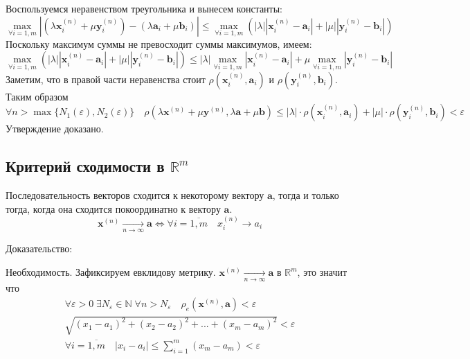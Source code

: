 \begin{enumerate}
  Воспользуемся неравенством треугольника и вынесем константы:
  $$
  \underset{\forall i=1, m}{\max}{|(\lambda \textbf {x}^{(n)}_i + \mu \textbf {y}^{(n)}_i) - (\lambda \textbf {a}_i + \mu \textbf {b}_i)|} \leq \underset{\forall i=1, m}{\max}{(|\lambda| |\textbf {x}^{(n)}_i - \textbf {a}_i| + |\mu| |\textbf {y}^{(n)}_i - \textbf {b}_i|)}
  $$
  Поскольку максимум суммы не превосходит суммы максимумов, имеем:
  $$
  \underset{\forall i=1, m}{\max}{(|\lambda| |\textbf {x}^{(n)}_i - \textbf {a}_i| + |\mu| |\textbf {y}^{(n)}_i - \textbf {b}_i|)} \leq |\lambda| \underset{\forall i=1, m}{\max}{|\textbf {x}^{(n)}_i - \textbf {a}_i|} + \mu \underset{\forall i=1, m}{\max}{|\textbf {y}^{(n)}_i - \textbf {b}_i|}
  $$
  Заметим, что в правой части неравенства стоит $\rho(\textbf {x}^{(n)}_i, \textbf {a}_i )$ и $\rho(\textbf {y}^{(n)}_i, \textbf {b}_i )$. Таким образом
  $$
  \forall n > \max\{N_1(\varepsilon), N_2(\varepsilon)\} \quad \rho(\lambda \textbf {x}^{(n)} + \mu \textbf {y}^{(n)}, \lambda \textbf {a} + \mu \textbf {b}) \leq |\lambda| \cdot \rho(\textbf {x}^{(n)}_i, \textbf {a}_i ) + |\mu| \cdot \rho(\textbf {y}^{(n)}_i, \textbf {b}_i ) < \varepsilon
  $$
  Утверждение доказано.
  \subsection{Критерий сходимости в $\mathbb {R}^m$}
  
  Последовательность векторов сходится к некоторому вектору $\textbf {a}$, тогда и только тогда, когда она сходится покоординатно к вектору $\textbf {a}$.
  $$
  \textbf {x}^{(n)}  \underset{n \to \infty}{\longrightarrow} \textbf {a} \Leftrightarrow \forall i = \overline{1,m} \quad x^{(n)}_i \longrightarrow a_i
  $$
  
  Доказательство:
 
  Необходимость. Зафиксируем евклидову метрику. $\textbf {x}^{(n)}  \underset{n \to \infty}{\longrightarrow} \textbf {a}$ в $\mathbb {R}^m$, это значит что
  \begin{equation*}
  \begin{gathered}
  \forall \varepsilon > 0 \; \exists N_{\varepsilon} \in \mathbb {N} \; \forall n > N_{\varepsilon} \quad \rho_e(\textbf {x}^{(n)}, \textbf {a}) < \varepsilon\\
  \sqrt{(x_1 - a_1)^2 + (x_2 - a_2)^2 + ... + (x_m - a_m)^2} < \varepsilon\\
  \forall i = \overline{1,m} \quad |x_i - a_i| \leq \sum\limits_{i=1}^m (x_m - a_m) < \varepsilon
  \end{gathered}
  \end{equation*}
  

\end{enumerate}
